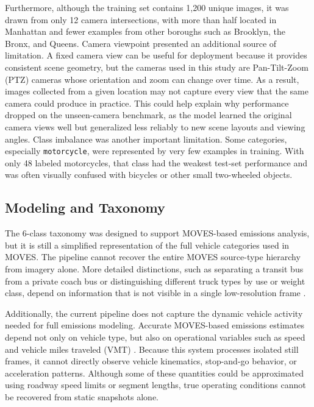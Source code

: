 Furthermore, although the training set contains 1,200 unique images, it was drawn 
from only 12 camera intersections, with more than half located in Manhattan and 
fewer examples from other boroughs such as Brooklyn, the Bronx, and Queens. Camera viewpoint 
presented an additional source of limitation. A fixed camera view can be useful for deployment 
because it provides consistent scene geometry, but the cameras used in this study 
are Pan-Tilt-Zoom (PTZ) cameras whose orientation and zoom can change over time. 
As a result, images collected from a given location may not capture every view that 
the same camera could produce in practice. This could help explain why performance 
dropped on the unseen-camera benchmark, as the model learned the original camera 
views well but generalized less reliably to new scene layouts and viewing angles. 
Class imbalance was another important limitation. Some categories, especially 
\verb|motorcycle|, were represented by very few examples in training. With only 
48 labeled motorcycles, that class had the weakest test-set performance and was 
often visually confused with bicycles or other small two-wheeled objects.


\subsection{Modeling and Taxonomy}

The 6-class taxonomy was designed to support MOVES-based emissions analysis, but
it is still a simplified representation of the full vehicle categories used in MOVES. 
The pipeline cannot recover the entire MOVES source-type hierarchy from imagery alone.
More detailed distinctions, such as separating a transit bus from a private coach bus
or distinguishing different truck types by use or weight class, depend on information 
that is not visible in a single low-resolution frame \cite{USEPA_road_pop_2020}.

Additionally, the current pipeline does not capture the dynamic vehicle activity 
needed for full emissions modeling. Accurate MOVES-based emissions estimates depend
not only on vehicle type, but also on operational variables such as speed and vehicle 
miles traveled (VMT) \cite{us_epa_moves3_2020}. 
Because this system processes isolated still frames, it 
cannot directly observe vehicle kinematics, stop-and-go behavior, or acceleration 
patterns. Although some of these quantities could be approximated using roadway 
speed limits or segment lengths, true operating conditions cannot be recovered from
static snapshots alone.


